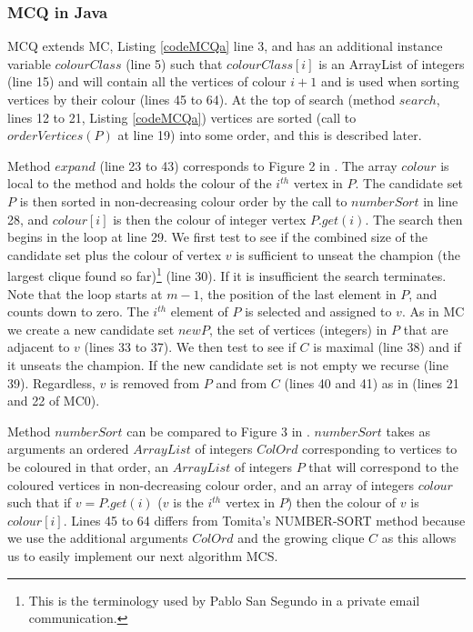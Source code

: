 \documentclass{l4proj}
\begin{document}
\subsubsection{MCQ in Java}
MCQ extends MC, Listing \ref{codeMCQa} line 3, and has an additional instance variable $colourClass$ (line 5) such that
$colourClass[i]$ is an ArrayList of integers (line 15) and will contain all the vertices 
of colour $i+1$ and is used when sorting vertices by their colour (lines 45 to 64).
At the top of search (method $search$, lines 12 to 21, Listing \ref{codeMCQa}) vertices are sorted (call to $orderVertices(P)$
at line 19) into some order, and this is described later.

Method $expand$ (line 23 to 43) corresponds to Figure 2 in \cite{tomita2003}. The array
$colour$ is local to the method and holds the colour of the $i^{th}$ vertex in $P$.
The candidate set $P$ is then sorted in
non-decreasing colour order by the call to $numberSort$ in line 28, and $colour[i]$ is then the colour
of integer vertex $P.get(i)$. The search then begins in the loop at line 29. We first test to see if the 
combined size of the candidate set plus the colour of
vertex $v$ is sufficient to unseat the champion (the largest clique found so far)\footnote{This is the terminology used by 
Pablo San Segundo in a private email communication.} (line 30). If it is insufficient the search terminates. Note that the loop starts
at $m-1$, the position of the last element in $P$, and counts down to zero. The $i^{th}$ element of $P$ is selected and assigned to $v$.
As in MC we create a new candidate set $newP$, the set of vertices (integers) in $P$ that are adjacent to $v$ (lines 33 to 37).
We then test to see if $C$ is maximal (line 38) and if it unseats the champion. If the new candidate set is not empty we recurse 
(line 39). Regardless, $v$ is removed from $P$ and from $C$ (lines 40 and 41) as in (lines 21 and 22 of MC0).

Method $numberSort$ can be compared to Figure 3 in \cite{tomita2003}. $numberSort$ takes as arguments an ordered $ArrayList$ of integers 
$ColOrd$ corresponding to vertices to be coloured in that order, an $ArrayList$ of integers $P$ that will correspond to the coloured vertices
in non-decreasing colour order, and an array of integers $colour$ such that if $v = P.get(i)$ ($v$ is the $i^{th}$ vertex in $P$)
then the colour of $v$ is $colour[i]$. Lines 45 to 64 differs from Tomita's NUMBER-SORT method because we use
the additional arguments $ColOrd$ and the growing clique $C$ as this allows us to easily implement our next algorithm MCS. 
\end{document}
